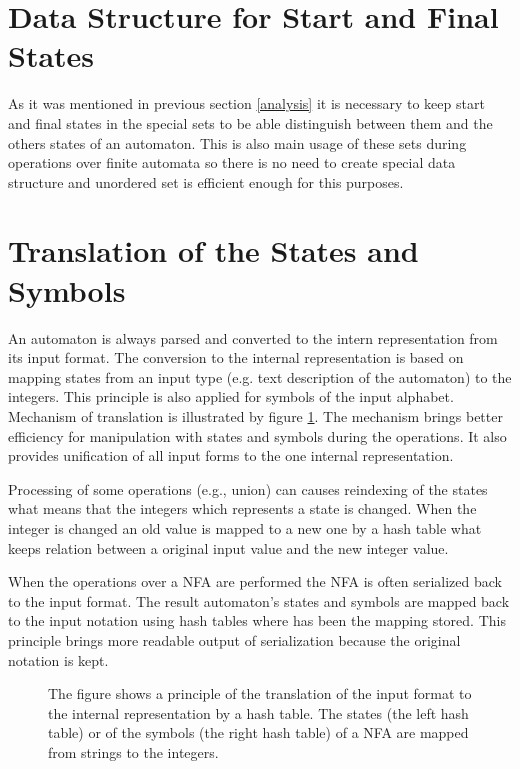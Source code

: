 \section{Data Structure for Start and Final States}
As it was mentioned in previous section \ref{analysis} it is necessary to keep start and final states in the special sets to 
be able distinguish between them and the others states of an automaton. This is also main usage of these sets during operations 
over finite automata so there is no need to create special data structure and unordered set is efficient enough for this purposes.

\section{Translation of the States and Symbols}
\label{sectionTranslate}
An automaton is always parsed and converted to the intern representation from its input format. 
The conversion to the internal representation is based on mapping states from an input type (e.g. text description of the automaton) 
to the integers. This principle is also applied for symbols of the input alphabet. 
Mechanism of translation is illustrated by figure \ref{figExplicitFATransl}. 
The mechanism brings better efficiency for manipulation with states and symbols
during the operations. It also provides unification of all input forms to the one internal representation. 

Processing of some operations (e.g., union) can causes reindexing of the states what means that the integers 
which represents a state is changed. When the integer is changed an old value is mapped to a new one by a hash table what keeps 
relation between a original input value and the new integer value.

When the operations over a NFA are performed the NFA is often serialized back to the input format. The result 
automaton's states and symbols are mapped back to the input notation using hash tables where has been the mapping stored. This
principle brings more readable output of serialization because the original notation is kept.

\begin{figure}[bt]
\begin{center}

    \caption{The figure shows a principle of the translation of the input format to the internal representation by a hash table. 
      The states (the left hash table) or of the symbols (the right hash table) of a NFA are mapped from strings to the integers.}
		\label{figExplicitFATransl}
\end{center}
\end{figure}

